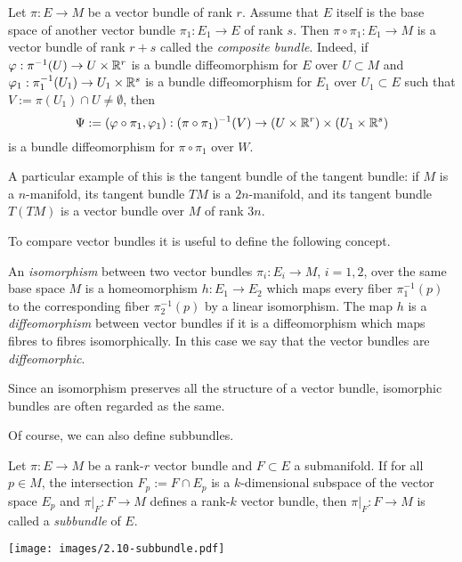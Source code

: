 \begin{example}
  Let $\pi:E \to M$ be a vector bundle of rank $r$.
  Assume that $E$ itself is the base space of another vector bundle $\pi_1: E_1\to E$ of rank $s$.
  Then $\pi\circ\pi_1: E_1 \to M$ is a vector bundle of rank $r+s$ called the \emph{composite bundle}. Indeed, if $\varphi:\pi^{-1}(U)\to U\times\mathbb{R}^r$ is a bundle diffeomorphism for $E$ over $U\subset M$ and $\varphi_1:\pi_1^{-1}(U_1)\to U_1\times\mathbb{R}^s$ is a bundle diffeomorphism for $E_1$ over $U_1\subset E$ such that $V := \pi(U_1)\cap U\neq \emptyset$, then
  \begin{equation}
    \Psi:=(\varphi\circ\pi_1, \varphi_1): (\pi\circ\pi_1)^{-1}(V)\to (U\times\mathbb{R}^r)\times (U_1\times\mathbb{R}^s)
  \end{equation}
  is a bundle diffeomorphism for $\pi\circ\pi_1$ over $W$.

  A particular example of this is the tangent bundle of the tangent bundle: if $M$ is a $n$-manifold, its tangent bundle $TM$ is a $2n$-manifold, and its tangent bundle $T(TM)$ is a vector bundle over $M$ of rank $3n$.
\end{example}

To compare vector bundles it is useful to define the following concept.
\begin{definition}
  An \emph{isomorphism} between two vector bundles $\pi_i: E_i \to M$, $i=1,2$, over the same base space $M$ is a homeomorphism $h:E_1 \to E_2$ which maps every fiber $\pi_1^{-1}(p)$ to the corresponding fiber $\pi_2^{-1}(p)$ by a linear isomorphism.
  The map $h$ is a \emph{diffeomorphism} between vector bundles if it is a diffeomorphism which maps fibres to fibres isomorphically.
  In this case we say that the vector bundles are \emph{diffeomorphic}.
\end{definition}

Since an isomorphism preserves all the structure of a vector bundle, isomorphic bundles are often regarded as the same.

Of course, we can also define subbundles.

\begin{definition}
  Let $\pi:E \to M$ be a rank-$r$ vector bundle and $F\subset E$ a submanifold.
  If for all $p\in M$, the intersection $F_p := F\cap E_p$ is a $k$-dimensional subspace of the vector space $E_p$ and $\pi|_F : F \to M$ defines a rank-$k$ vector bundle, then $\pi|_F: F \to M$ is called a \emph{subbundle} of $E$.
\end{definition}
%
\begin{marginfigure}
  \texttt{[image: images/2.10-subbundle.pdf]}
\end{marginfigure}
%

